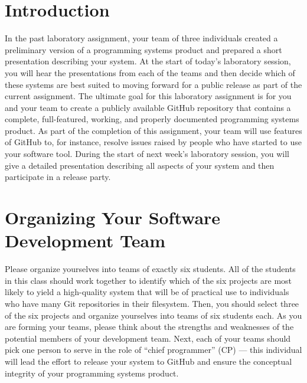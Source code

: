 

\usepackage[compact]{titlesec}



\vspace*{-.1in}
\section*{Introduction}

In the past laboratory assignment, your team of three individuals created a preliminary version of a programming systems
product and prepared a short presentation describing your system. At the start of today's laboratory session, you will
hear the presentations from each of the teams and then decide which of these systems are best suited to moving forward
for a public release as part of the current assignment. The ultimate goal for this laboratory assignment is for you and
your team to create a publicly available GitHub repository that contains a complete, full-featured, working, and
properly documented programming systems product. As part of the completion of this assignment, your team will use
features of GitHub to, for instance, resolve issues raised by people who have started to use your software tool. During
the start of next week's laboratory session, you will give a detailed presentation describing all aspects of your system
and then participate in a release party.

\section*{Organizing Your Software Development Team}

Please organize yourselves into teams of exactly six students. All of the students in this class should work together
to identify which of the six projects are most likely to yield a high-quality system that will be of practical use to
individuals who have many Git repositories in their filesystem. Then, you should select three of the six projects and
organize yourselves into teams of six students each.  As you are forming your teams, please think about the strengths
and weaknesses of the potential members of your development team. Next, each of your teams should pick one person to
serve in the role of ``chief programmer'' (CP) --- this individual will lead the effort to release your system to GitHub and
ensure the conceptual integrity of your programming systems product.

